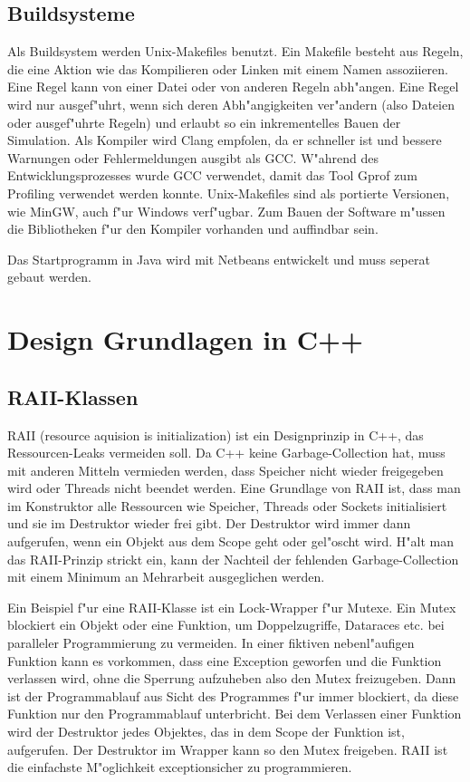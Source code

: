 \documentclass[14pt, a4paper]{report}
\begin{document}
\section{Buildsysteme}
Als Buildsystem werden Unix-Makefiles benutzt. Ein Makefile besteht aus Regeln, die eine
Aktion wie das Kompilieren oder Linken mit einem Namen assoziieren. Eine Regel kann von
einer Datei oder von anderen Regeln abh"angen. Eine Regel wird nur ausgef"uhrt, wenn 
sich deren Abh"angigkeiten ver"andern (also Dateien oder ausgef"uhrte Regeln) und erlaubt
so ein inkrementelles Bauen
der Simulation. Als Kompiler wird Clang empfolen, da er schneller ist und bessere
Warnungen oder Fehlermeldungen ausgibt als GCC. W"ahrend des Entwicklungsprozesses 
wurde GCC verwendet, damit das Tool Gprof zum Profiling verwendet werden konnte.
Unix-Makefiles sind als portierte Versionen, wie MinGW, auch f"ur Windows verf"ugbar. 
Zum Bauen
der Software m"ussen die Bibliotheken f"ur den Kompiler vorhanden und auffindbar sein.

Das Startprogramm in Java wird mit Netbeans entwickelt und muss seperat gebaut werden.

\chapter{Design Grundlagen in C++}
\section{RAII-Klassen} \label{RAII}
RAII (resource aquision is initialization) ist ein Designprinzip in C++, das 
Ressourcen-Leaks vermeiden soll. Da C++ keine Garbage-Collection hat, muss mit
anderen Mitteln vermieden werden, 
dass Speicher nicht wieder freigegeben wird oder Threads  nicht
beendet werden. Eine Grundlage von RAII ist, dass man im Konstruktor alle Ressourcen
wie Speicher, Threads oder Sockets initialisiert und sie im Destruktor wieder frei gibt.
Der Destruktor wird immer dann aufgerufen, wenn ein Objekt aus dem Scope geht oder
gel"oscht wird. H"alt man das RAII-Prinzip strickt ein, kann der Nachteil der fehlenden
Garbage-Collection mit einem Minimum an Mehrarbeit ausgeglichen werden. 

Ein Beispiel f"ur eine RAII-Klasse ist ein Lock-Wrapper f"ur Mutexe. Ein Mutex blockiert ein Objekt
oder eine Funktion, um Doppelzugriffe, Dataraces etc. bei paralleler Programmierung
zu vermeiden. 
In einer fiktiven nebenl"aufigen Funktion kann es vorkommen, dass eine Exception geworfen und die
Funktion verlassen wird, ohne die Sperrung aufzuheben also den Mutex freizugeben. 
Dann ist der Programmablauf 
aus Sicht des Programmes f"ur immer blockiert, da diese Funktion nur den Programmablauf
unterbricht. Bei dem Verlassen einer Funktion wird der Destruktor jedes Objektes, das
in dem Scope der Funktion ist, aufgerufen. Der Destruktor im Wrapper kann so den Mutex freigeben.
RAII ist die einfachste M"oglichkeit exceptionsicher zu programmieren. 
\end{document}
